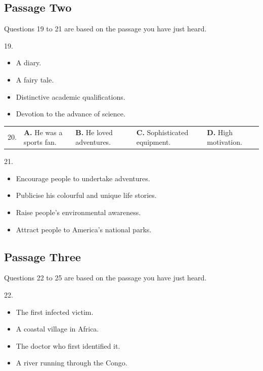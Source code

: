 \documentclass[UTF8,11pt]{ctexart}
\begin{document}
\subsection*{Passage Two}


Questions 19 to 21 are based on the passage you have just heard.


19.


\begin{itemize}[leftmargin=2em,itemsep=.2em,topsep=.4em]\item[A.] A diary.
\item[B.] A fairy tale.
\item[C.] Distinctive academic qualifications.
\item[D.] Devotion to the advance of science.
\end{itemize}

\noindent\begin{tabularx}{\linewidth}{@{}lXXXX@{}}20. & \textbf{A.} He was a sports fan. & \textbf{B.} He loved adventures. & \textbf{C.} Sophisticated equipment. & \textbf{D.} High motivation.\\\end{tabularx}\par

21.


\begin{itemize}[leftmargin=2em,itemsep=.2em,topsep=.4em]\item[A.] Encourage people to undertake adventures.
\item[B.] Publicise his colourful and unique life stories.
\item[C.] Raise people’s environmental awareness.
\item[D.] Attract people to America’s national parks.
\end{itemize}

\subsection*{Passage Three}


Questions 22 to 25 are based on the passage you have just heard.


22.


\begin{itemize}[leftmargin=2em,itemsep=.2em,topsep=.4em]\item[A.] The first infected victim.
\item[B.] A coastal village in Africa.
\item[C.] The doctor who first identified it.
\item[D.] A river running through the Congo.
\end{itemize}
\end{document}
